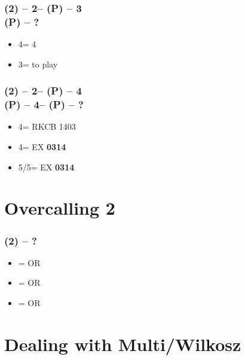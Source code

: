 \subsubsection*{(2\spades) -- 2\nt -- (P) -- 3\spades \\
                (P) -- ?}
\begin{itemize}
    \item 4\clubs = 4\hearts
    \item 3\nt = to play
\end{itemize}

\subsubsection*{(2\spades) -- 2\nt -- (P) -- 4\diams \\
                (P) -- 4\hearts -- (P) -- ?}
\begin{itemize}
    \item 4\spades = RKCB 1403
    \item 4\nt = EX \spades \textbf{0314}
    \item 5\clubs/5\diams = EX \textbf{0314}
\end{itemize}

\section{\texorpdfstring{Overcalling 2\ntx}{overcalling2nt}}\label{sec:overcalling2nt}

\subsubsection*{(2\nt) -- ?}
\begin{itemize}
    \item \dbl = \clubs\spades OR \diams\hearts
    \item \clubs = \clubs\diams OR \hearts\spades
    \item \diams = \clubs\hearts OR \diams\spades
\end{itemize}

\section{\texorpdfstring{Dealing with Multi/Wilkosz}{dealingWithMulti}}\label{sec:dealingWithMulti}

